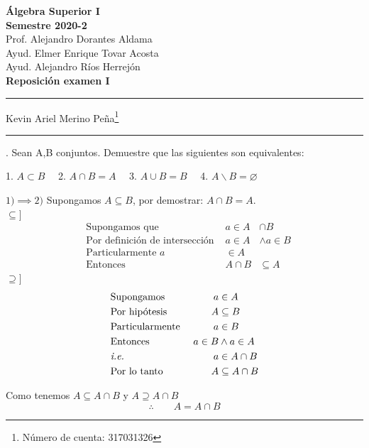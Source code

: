 \documentclass[letterpaper]{article}
\renewcommand{\*}{\cdot}
\theoremstyle{definition}
\begin{document}
\begin{center}
	\vspace{-114pt}
	\textbf{\large Álgebra Superior I}\\
	\textbf{ Semestre 2020-2}\\
	Prof. Alejandro Dorantes Aldama\\
	Ayud. Elmer Enrique Tovar Acosta \\
	Ayud. Alejandro Ríos Herrejón \\
	\textbf{Reposición examen I}
\rule{19cm}{0.2mm}
	\vspace{-0.7cm}
	\begin{center}
Kevin Ariel Merino Peña\footnote[2]{Número de cuenta: 317031326}
	\end{center}
	\vspace{-0.5cm}
\rule{19cm}{0.2mm}
\end{center}
. Sean A,B conjuntos. Demuestre que las siguientes son equivalentes:
\begin{center}
	1. $ A \subset B \quad$ 2. $ A \cap B = A \quad$ 3. $ A \cup B = B \quad$ 4. $ A \backslash B = \varnothing $
\end{center}
$ 1) \implies 2) $ Supongamos $ A \subseteq B $, por demostrar: $ A \cap B = A $.
\\ $\subseteq]  $
\begin{align*}
	&\text{Supongamos que } & a \in A&\cap B  \\
	&\text{Por definición de intersección } & a \in A &\land a \in  B \\
	&\text{Particularmente } a &\in A \\
	&\text{Entonces } &  A \cap B &\subseteq A 
\end{align*}
$\supseteq]  $
\begin{align*}
	&\text{Supongamos } & a &\in A\\
	&\text{Por hipótesis } & A &\subseteq B \\
	&\text{Particularmente } & a &\in B \\
	&\text{Entonces } & a \in B & \land a \in A\\
	&\text{\textit{i.e.} } & a &\in A \cap B \\
	&\text{Por lo tanto } & A &\subseteq A \cap B 
\end{align*}
\begin{center}
	Como tenemos $ A \subseteq A \cap B  $ y $ A \supseteq A \cap B  $
	$$ \therefore \qquad A = A \cap B  $$
\end{center}
\end{document}
